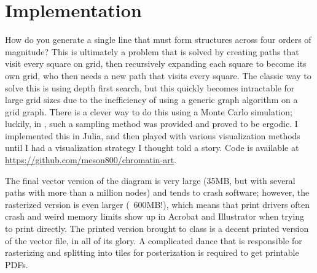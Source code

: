 \documentclass[11pt]{article}
\begin{document}
\section{Implementation}
How do you generate a single line that must form structures across four orders of magnitude? This is ultimately a problem that is solved by creating paths that visit every square on grid, then recursively expanding each square to become its own grid, who then needs a new path that visits every square. The classic way to solve this is using depth first search, but this quickly becomes intractable for large grid sizes due to the inefficiency  of using a generic graph algorithm on a grid graph. There is a clever way to do this using a Monte Carlo simulation; luckily, in \textcite{mansfieldUnbiasedSamplingLattice2006}, such a sampling method was provided and proved to be ergodic. I implemented this in Julia, and then played with various visualization methods until I had a visualization strategy I thought told a story. Code is available at \url{https://github.com/meson800/chromatin-art}.

The final vector version of the diagram is very large (35MB, but with several paths with more than a million nodes) and tends to crash software; however, the rasterized version is even larger (~600MB!), which means that print drivers often crash and weird memory limits show up in Acrobat and Illustrator when trying to print directly. The printed version brought to class is a decent printed version of the vector file, in all of its glory. A complicated dance that is responsible for rasterizing and splitting into tiles for posterization is required to get printable PDFs.

\printbibliography
\end{document}
